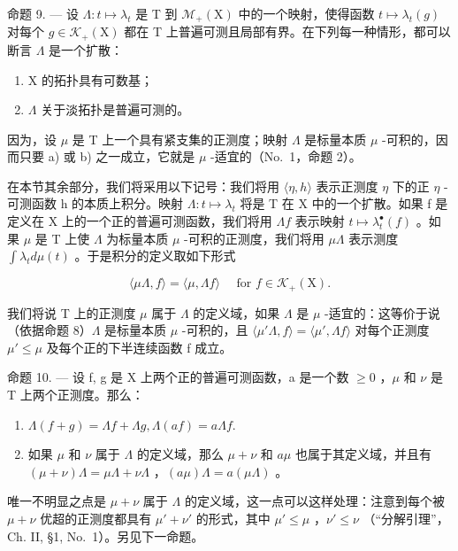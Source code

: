 命题 9. --- 设 \(\Lambda : t \mapsto \lambda_t\) 是 T 到 \(\mathcal{M}_+(\mathrm{X})\) 中的一个映射，使得函数 \(t \mapsto \lambda_t(g)\) 对每个 \(g \in \mathcal{K}_+(\mathrm{X})\) 都在 T 上普遍可测且局部有界。在下列每一种情形，都可以断言 \(\Lambda\) 是一个扩散：

\begin{enumerate}
\def\labelenumi{\alph{enumi})}
\item
  X 的拓扑具有可数基；
\item
  \(\Lambda\) 关于淡拓扑是普遍可测的。
\end{enumerate}

因为，设 \(\mu\) 是 T 上一个具有紧支集的正测度；映射 \(\Lambda\) 是标量本质 \(\mu\) -可积的，因而只要 a) 或 b) 之一成立，它就是 \(\mu\) -适宜的（No.~1，命题 2）。

在本节其余部分，我们将采用以下记号：我们将用 \(\langle\eta,h\rangle\) 表示正测度 \(\eta\) 下的正 \(\eta\) -可测函数 h 的本质上积分。映射 \(\Lambda:t\mapsto\lambda_{t}\) 将是 T 在 X 中的一个扩散。如果 f 是定义在 X 上的一个正的普遍可测函数，我们将用 \(\Lambda f\) 表示映射 \(t\mapsto\lambda_{t}^{\bullet}(f)\) 。如果 \(\mu\) 是 T 上使 \(\Lambda\) 为标量本质 \(\mu\) -可积的正测度，我们将用 \(\mu\Lambda\) 表示测度 \(\int\lambda_{t}d\mu(t)\) 。于是积分的定义取如下形式

\[
\langle \mu \Lambda , f \rangle = \langle \mu , \Lambda f \rangle \quad \text { for } f \in \mathscr {K} _ {+} (\mathrm{X}).
\]

我们将说 T 上的正测度 \(\mu\) 属于 \(\Lambda\) 的定义域，如果 \(\Lambda\) 是 \(\mu\) -适宜的：这等价于说（依据命题 8）\(\Lambda\) 是标量本质 \(\mu\) -可积的，且 \(\langle\mu'\Lambda,f\rangle=\langle\mu',\Lambda f\rangle\) 对每个正测度 \(\mu'\leqslant\mu\) 及每个正的下半连续函数 f 成立。

命题 10. --- 设 f, g 是 X 上两个正的普遍可测函数，a 是一个数 \(\geqslant 0\) ，\(\mu\) 和 \(\nu\) 是 T 上两个正测度。那么：

\begin{enumerate}
\def\labelenumi{\alph{enumi})}
\item
  \(\Lambda (f + g) = \Lambda f + \Lambda g, \Lambda (af) = a\Lambda f.\)
\item
  如果 \(\mu\) 和 \(\nu\) 属于 \(\Lambda\) 的定义域，那么 \(\mu + \nu\) 和 \(a\mu\) 也属于其定义域，并且有 \((\mu + \nu)\Lambda = \mu \Lambda + \nu \Lambda\) ，\((a\mu)\Lambda = a(\mu \Lambda)\) 。
\end{enumerate}

唯一不明显之点是 \(\mu + \nu\) 属于 \(\Lambda\) 的定义域，这一点可以这样处理：注意到每个被 \(\mu + \nu\) 优超的正测度都具有 \(\mu' + \nu'\) 的形式，其中 \(\mu' \leqslant \mu\) ，\(\nu' \leqslant \nu\) （“分解引理”，Ch. II, §1, No.~1）。另见下一命题。

